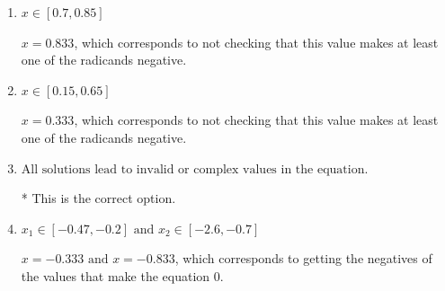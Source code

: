 \documentclass{extbook}[14pt]
\begin{document}
\begin{enumerate}
{\begin{enumerate}[label=\Alph*.]
$x = 0.333 \text{ and } x = 0.833$, which corresponds to not checking that BOTH values make at least one of the radicands negative.
\item \( x \in [0.7,0.85] \)

$x = 0.833$, which corresponds to not checking that this value makes at least one of the radicands negative.
\item \( x \in [0.15,0.65] \)

$x = 0.333$, which corresponds to not checking that this value makes at least one of the radicands negative.
\item \( \text{All solutions lead to invalid or complex values in the equation.} \)

* This is the correct option.
\item \( x_1 \in [-0.47, -0.2] \text{ and } x_2 \in [-2.6,-0.7] \)

$x = -0.333 \text{ and } x = -0.833$, which corresponds to getting the negatives of the values that make the equation 0.
\end{enumerate}

}
\end{enumerate}
\end{document}
